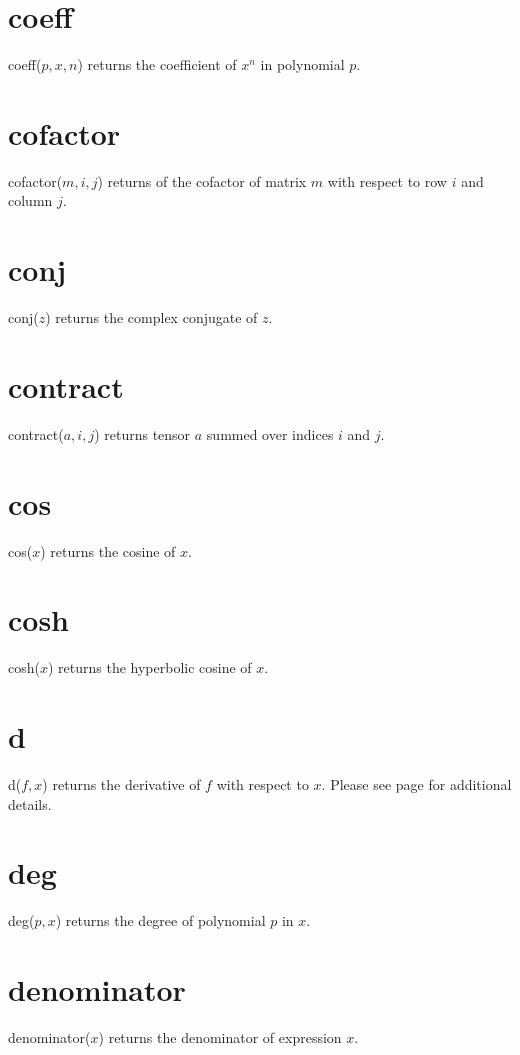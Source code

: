\documentclass[12pt,openany]{report}
\begin{document}
\section*{coeff}
coeff($p,x,n$) returns the coefficient of $x^n$ in polynomial $p$.

\section*{cofactor}
cofactor($m,i,j$) returns of the cofactor of matrix $m$ with respect to row $i$ and column $j$.

\section*{conj}
conj($z$) returns the complex conjugate of $z$.

\section*{contract}
contract($a,i,j$) returns tensor $a$ summed over indices $i$ and $j$.

\section*{cos}
cos($x$) returns the cosine of $x$.

\section*{cosh}
cosh($x$) returns the hyperbolic cosine of $x$.

\section*{d}
d($f,x$) returns the derivative of $f$ with respect to $x$.
Please see page \pageref{d} for additional details.

\section*{deg}
deg($p,x$) returns the degree of polynomial $p$ in $x$.

\section*{denominator}
denominator($x$) returns the denominator of expression $x$.
\end{document}
